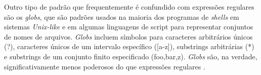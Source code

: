 Outro tipo de padrão que frequentemente é confundido com expressões regulares são os \textit{globs}, que são padrões usados na maioria dos programas de \textit{shells} em  sistemas \textit{Unix-like} e em algumas linguagens de script para representar conjuntos de nomes de arquivos. \textit{Globs} incluem símbolos para caracteres arbitrários únicos (?), caracteres únicos de um intervalo específico ([a-z]), substrings arbitrárias (*) e substrings de um conjunto finito especificado ({foo,ba{r,z}}). \textit{Globs} são, na verdade, significativamente menos poderosos do que expressões regulares \cite{erickson2014}.






